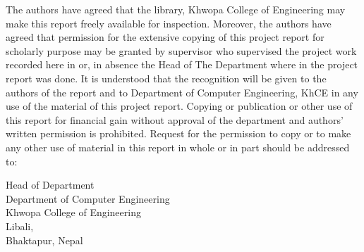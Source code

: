 
The authors have agreed that the library, Khwopa College of Engineering may
make this report freely available for inspection. Moreover, the authors have
agreed that permission for the extensive copying of this project report for
scholarly purpose may be granted by supervisor who supervised the project work
recorded here in or, in absence the Head of The Department where in the project
report was done. It is understood that the recognition will be given to the
authors of the report and to Department of Computer Engineering, KhCE in any
use of the material of this project report. Copying or publication or other use
of this report for financial gain without approval of the department and
authors' written permission is prohibited. Request for the permission to copy
or to make any other use of material in this report in whole or in part should
be addressed to:

\vspace{0.5cm}

\noindent
Head of Department\\
Department of Computer Engineering\\
Khwopa College of Engineering\\
Libali,\\
Bhaktapur, Nepal

\clearpage
